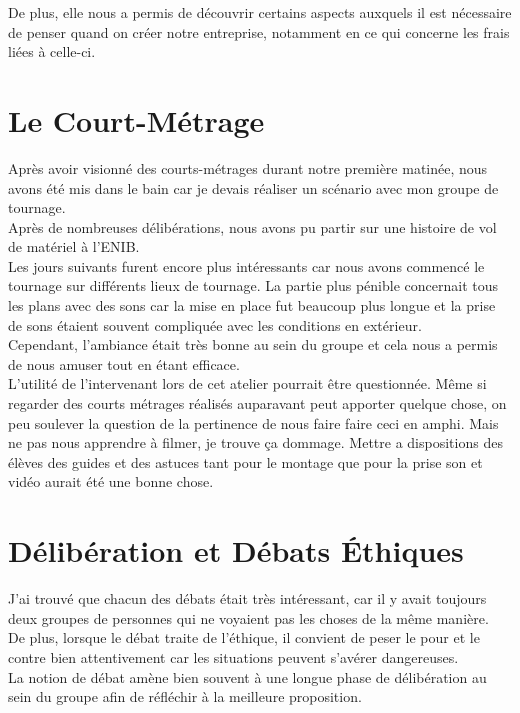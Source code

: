 De plus, elle nous a permis de découvrir certains aspects auxquels il est nécessaire de penser quand on créer notre entreprise, notamment en ce qui concerne les frais liées à celle-ci.





\section{Le Court-Métrage}

Après avoir visionné des courts-métrages durant notre première matinée, nous avons été mis dans le bain car je devais réaliser un scénario avec mon groupe de tournage. \\ Après de nombreuses délibérations, nous avons pu partir sur une histoire de vol de matériel à l'ENIB.\\

Les jours suivants furent encore plus intéressants car nous avons commencé le tournage sur différents lieux de tournage. La partie plus pénible concernait tous les plans avec des sons car la mise en place fut beaucoup plus longue et la prise de sons étaient souvent compliquée avec les conditions en extérieur.\\
Cependant, l'ambiance était très bonne au sein du groupe et cela nous a permis de nous amuser tout en étant efficace.\\

L'utilité de l'intervenant lors de cet atelier pourrait être questionnée. Même si regarder des courts métrages réalisés auparavant peut apporter quelque chose, on peu soulever la question de la pertinence de nous faire faire ceci en amphi. Mais ne pas nous apprendre à filmer, je trouve ça dommage. Mettre a dispositions des élèves des guides et des astuces tant pour le montage que pour la prise son et vidéo aurait été une bonne chose.



\section{Délibération et Débats Éthiques}

J'ai trouvé que chacun des débats était très intéressant, car il y avait toujours deux groupes de personnes qui ne voyaient pas les choses de la même manière.\\


De plus, lorsque le débat traite de l'éthique, il convient de peser le pour et le contre bien attentivement car les situations peuvent s'avérer dangereuses.\\
La notion de débat amène bien souvent à une longue phase de délibération au sein du groupe afin de réfléchir à la meilleure proposition. \\

